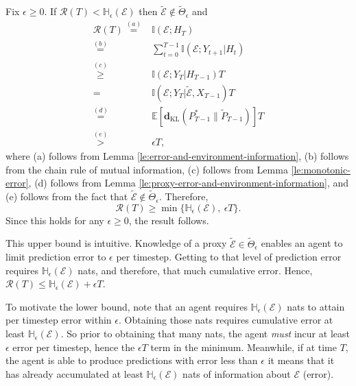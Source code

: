 \documentclass[twoside,11pt]{article}
\renewenvironment{proof}{\par\noindent{\bf Proof\ }}{\hfill\BlackBox\\[2mm]}
\newenvironment{proof}{\par\noindent{\bf Proof\ }}{\hfill\BlackBox\\[2mm]}
\def\environment{\mathcal{E}}
\def\proxy{\tilde{\environment}}
\def\proxyset{\tilde{\Theta}}
\def\regret{\mathcal{R}}
\def\KL{\mathbf{d}_{\mathrm{KL}}}
\def\E{\mathbb{E}}
\def\H{\mathbb{H}}
\def\I{\mathbb{I}}
\begin{document}
\begin{proof}
    
Fix $\epsilon \geq 0$.  If $\regret(T) < \H_\epsilon(\environment)$ then $\proxy \notin \proxyset_\epsilon$ and
\begin{align*}
\regret(T)
\overset{(a)}{=}& \I(\environment; H_T) \\
\overset{(b)}{=}& \sum_{t=0}^{T-1} \I(\environment; Y_{t+1} | H_t) \\
\overset{(c)}{\geq}& \I(\environment; Y_T | H_{T-1}) T \\
=& \I(\environment; Y_T | \proxy, X_{T-1}) T \\
\overset{(d)}{=}& \E[\KL(P^*_{T-1} \| \tilde{P}_{T-1})] T \\
\overset{(e)}{>}& \epsilon T,
\end{align*}
where (a) follows from Lemma \ref{le:error-and-environment-information}, (b) follows from the chain rule of mutual information, (c) follows from Lemma \ref{le:monotonic-error}, (d) follows from Lemma \ref{le:proxy-error-and-environment-information}, and (e) follows from the fact that $\proxy \notin \proxyset_\epsilon$.  Therefore, 
$$\regret(T) \geq \min\{\H_\epsilon(\environment),\ \epsilon T\}.$$
Since this holds for any $\epsilon \geq 0$, the result follows.
\end{proof}

This upper bound is intuitive. Knowledge of a proxy $\proxy \in \proxyset_\epsilon$ enables an agent to limit prediction error to $\epsilon$ per timestep. Getting to that level of prediction error requires $\H_\epsilon(\environment)$ nats, and therefore, that much cumulative error. Hence, $\regret(T) \leq \H_\epsilon(\environment) + \epsilon T$.

To motivate the lower bound, note that an agent requires $\H_\epsilon(\environment)$ nats to attain per timestep error within $\epsilon$. Obtaining those nats requires cumulative error at least $\H_\epsilon(\environment)$. So prior to obtaining that many nats, the agent \emph{must} incur at least $\epsilon$ error per timestep, hence the $\epsilon T$ term in the minimum. Meanwhile, if at time $T$, the agent is able to produce predictions with error less than $\epsilon$ it means that it has already accumulated at least $\H_\epsilon(\environment)$ nats of information about $\environment$ (error).
\end{document}
